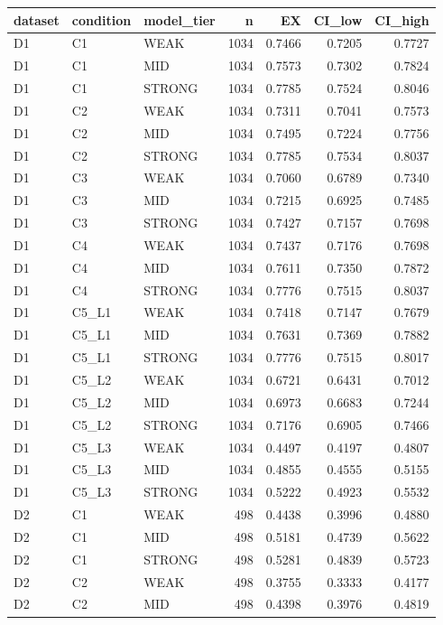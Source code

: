 \begin{tabular}{lllrrrr}
\toprule
dataset & condition & model\_tier & n & EX & CI\_low & CI\_high \\
\midrule
D1 & C1 & WEAK & 1034 & 0.7466 & 0.7205 & 0.7727 \\
D1 & C1 & MID & 1034 & 0.7573 & 0.7302 & 0.7824 \\
D1 & C1 & STRONG & 1034 & 0.7785 & 0.7524 & 0.8046 \\
D1 & C2 & WEAK & 1034 & 0.7311 & 0.7041 & 0.7573 \\
D1 & C2 & MID & 1034 & 0.7495 & 0.7224 & 0.7756 \\
D1 & C2 & STRONG & 1034 & 0.7785 & 0.7534 & 0.8037 \\
D1 & C3 & WEAK & 1034 & 0.7060 & 0.6789 & 0.7340 \\
D1 & C3 & MID & 1034 & 0.7215 & 0.6925 & 0.7485 \\
D1 & C3 & STRONG & 1034 & 0.7427 & 0.7157 & 0.7698 \\
D1 & C4 & WEAK & 1034 & 0.7437 & 0.7176 & 0.7698 \\
D1 & C4 & MID & 1034 & 0.7611 & 0.7350 & 0.7872 \\
D1 & C4 & STRONG & 1034 & 0.7776 & 0.7515 & 0.8037 \\
D1 & C5\_L1 & WEAK & 1034 & 0.7418 & 0.7147 & 0.7679 \\
D1 & C5\_L1 & MID & 1034 & 0.7631 & 0.7369 & 0.7882 \\
D1 & C5\_L1 & STRONG & 1034 & 0.7776 & 0.7515 & 0.8017 \\
D1 & C5\_L2 & WEAK & 1034 & 0.6721 & 0.6431 & 0.7012 \\
D1 & C5\_L2 & MID & 1034 & 0.6973 & 0.6683 & 0.7244 \\
D1 & C5\_L2 & STRONG & 1034 & 0.7176 & 0.6905 & 0.7466 \\
D1 & C5\_L3 & WEAK & 1034 & 0.4497 & 0.4197 & 0.4807 \\
D1 & C5\_L3 & MID & 1034 & 0.4855 & 0.4555 & 0.5155 \\
D1 & C5\_L3 & STRONG & 1034 & 0.5222 & 0.4923 & 0.5532 \\
D2 & C1 & WEAK & 498 & 0.4438 & 0.3996 & 0.4880 \\
D2 & C1 & MID & 498 & 0.5181 & 0.4739 & 0.5622 \\
D2 & C1 & STRONG & 498 & 0.5281 & 0.4839 & 0.5723 \\
D2 & C2 & WEAK & 498 & 0.3755 & 0.3333 & 0.4177 \\
D2 & C2 & MID & 498 & 0.4398 & 0.3976 & 0.4819 \\

\end{tabular}
